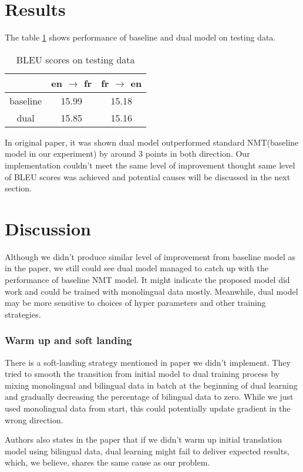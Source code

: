 \documentclass[11pt]{article}
\begin{document}
{\part{Results}
The table \ref{table:1} shows performance of baseline and dual model on testing data. 
\begin{table}
\begin{center}
 \begin{tabular}{||c c c||} 
 \hline
  & en $\to$ fr & fr $\to$ en \\ [0.5ex] 
 \hline\hline
 baseline & 15.99 & 15.18 \\
  \hline
 dual & 15.85 & 15.16 \\
  \hline
\end{tabular}
 \caption{BLEU scores on testing data}
\label{table:1}
\end{center}
\end{table}

In original paper\cite{he2016dual}, it was shown dual model outperformed standard NMT(baseline model in our experiment) by around 3 points in both direction. Our implementation couldn't meet the same level of improvement thought same level of BLEU scores was achieved and potential causes will be discussed in the next section.
\part{Discussion}
Although we didn't produce similar level of improvement from baseline model as in the paper, we still could see dual model managed to catch up with the performance of baseline NMT model. It might indicate the proposed model did work and could be trained with monolingual data mostly. Meanwhile, dual model may be more sensitive to choices of hyper parameters and other training strategies.

\section{Warm up and soft landing}
There is a soft-landing strategy mentioned in paper we didn't implement. They tried to smooth the transition from initial model to dual training process by mixing monolingual and bilingual data in batch at the beginning of dual learning and gradually decreasing the percentage of bilingual data to zero. While we just used monolingual data from start, this could potentially update gradient in the wrong direction. 

Authors also states in the paper\cite{he2016dual} that if we didn't warm up initial translation model using bilingual data, dual learning might fail to deliver expected results, which, we believe, shares the same cause as our problem.

}
\end{document}
